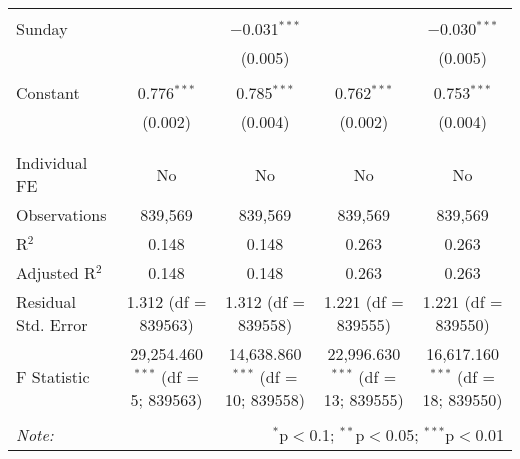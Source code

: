 \documentclass[
]{article}
\begin{document}
\begin{table}[!htbp]
{\begin{tabular}{@{\extracolsep{5pt}}lcccc}
  & & & & \\ 
 Sunday &  & $-$0.031$^{***}$ &  & $-$0.030$^{***}$ \\ 
  &  & (0.005) &  & (0.005) \\ 
  & & & & \\ 
 Constant & 0.776$^{***}$ & 0.785$^{***}$ & 0.762$^{***}$ & 0.753$^{***}$ \\ 
  & (0.002) & (0.004) & (0.002) & (0.004) \\ 
  & & & & \\ 
\hline \\[-1.8ex] 
Individual FE & No & No & No & No \\ 
Observations & 839,569 & 839,569 & 839,569 & 839,569 \\ 
R$^{2}$ & 0.148 & 0.148 & 0.263 & 0.263 \\ 
Adjusted R$^{2}$ & 0.148 & 0.148 & 0.263 & 0.263 \\ 
Residual Std. Error & 1.312 (df = 839563) & 1.312 (df = 839558) & 1.221 (df = 839555) & 1.221 (df = 839550) \\ 
F Statistic & 29,254.460$^{***}$ (df = 5; 839563) & 14,638.860$^{***}$ (df = 10; 839558) & 22,996.630$^{***}$ (df = 13; 839555) & 16,617.160$^{***}$ (df = 18; 839550) \\ 
\hline 
\hline \\[-1.8ex] 
\textit{Note:}  & \multicolumn{4}{r}{$^{*}$p$<$0.1; $^{**}$p$<$0.05; $^{***}$p$<$0.01} \\ 
\end{tabular}
} 
\end{table} 
\newpage
\end{document}
